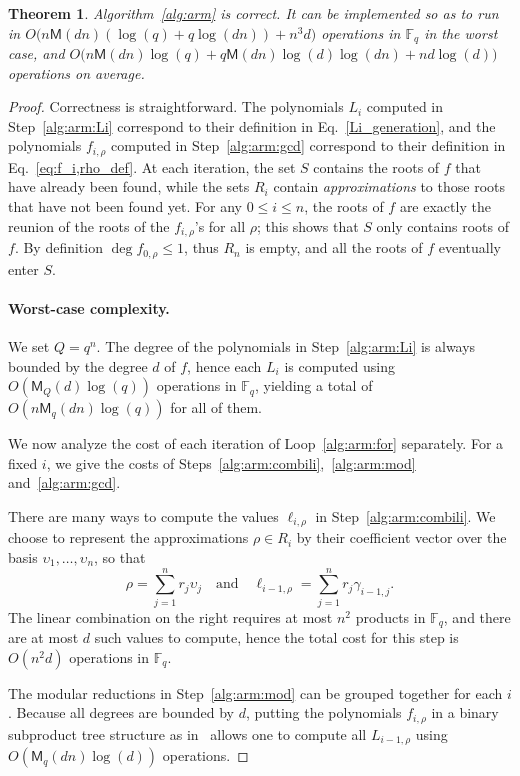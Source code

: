 \documentclass{article}
\newcommand{\ff}[1]{\mathbb{F}_{#1}}
\newcommand{\qq}{q}
\newcommand{\basef}{\ff{\qq}}
\newcommand{\Mul}{\mathsf{M}}
\newtheorem{Theo}{Theorem}
\begin{document}
\begin{Theo}
  Algorithm~\ref{alg:arm} is correct. It can be implemented so as to
  run in $O\bigl(n\Mul(dn)(\log(q) + q\log(dn)) + n^3d\bigr)$
  operations in $\basef$ in the worst case, and
  $O\bigl(n\Mul(dn)\log(q) + q\Mul(dn)\log(d)\log(dn) +
  nd\log(d)\bigr)$ operations on average.
\end{Theo}
\begin{proof}
  Correctness is straightforward. The polynomials $L_i$ computed in
  Step~\ref{alg:arm:Li} correspond to their definition in
  Eq.~\eqref{Li_generation}, and the polynomials $f_{i,\rho}$ computed
  in Step~\ref{alg:arm:gcd} correspond to their definition in
  Eq.~\eqref{eq:f_i,rho_def}. %
  At each iteration, the set $S$ contains the roots of $f$ that have
  already been found, while the sets $R_i$ contain
  \emph{approximations} to those roots that have not been found yet. %
  For any $0\le i\le n$, the roots of $f$ are exactly the reunion of
  the roots of the $f_{i,\rho}$'s for all $\rho$; this shows that $S$
  only contains roots of $f$. %
  By definition $\deg f_{0,\rho}\le 1$, thus $R_n$ is empty, and all
  the roots of $f$ eventually enter $S$.

  \paragraph{Worst-case complexity.} We set $Q=q^n$.  The degree of the
  polynomials in Step~\ref{alg:arm:Li} is always bounded by the degree
  $d$ of $f$, hence each $L_i$ is computed using
  $O(\Mul_Q(d)\log(q))$ operations in $\basef$, yielding a total of
  $O(n\Mul_q(dn)\log(q))$ for all of them.

  We now analyze the cost of each iteration of Loop~\ref{alg:arm:for}
  separately. For a fixed $i$, we give the costs of
  Steps~\ref{alg:arm:combili},~\ref{alg:arm:mod}
  and~\ref{alg:arm:gcd}.

  There are many ways to compute the values $\ell_{i,\rho}$ in
  Step~\ref{alg:arm:combili}. We choose to represent the
  approximations $\rho\in R_i$ by their coefficient vector over the
  basis $\upsilon_1,\dots,\upsilon_n$, so that
  \[
    \rho = \sum_{j=1}^n r_j\upsilon_j 
    \quad\text{and}\quad
    \ell_{i-1,\rho} = \sum_{j=1}^n r_j\gamma_{i-1,j}.
  \]
  The linear combination on the right requires at most $n^2$ products
  in $\basef$, and there are at most $d$ such values to compute, hence
  the total cost for this step is $O(n^2d)$ operations in $\basef$.

  The modular reductions in Step~\ref{alg:arm:mod} can be grouped
  together for each $i$. %
  Because all degrees are bounded by $d$, putting the polynomials
  $f_{i,\rho}$ in a binary subproduct tree structure as
  in~\cite[Lemma~10.4]{Gathen2003} allows one to compute all
  $L_{i-1,\rho}$ using $O(\Mul_q(dn)\log(d))$ operations.


\end{proof}
\end{document}
